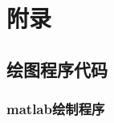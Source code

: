 \chapter*{附录}
\appendix

\renewcommand{\thesection}{\Alph{section}}


\section{绘图程序代码}

\subsection{matlab绘制程序}

